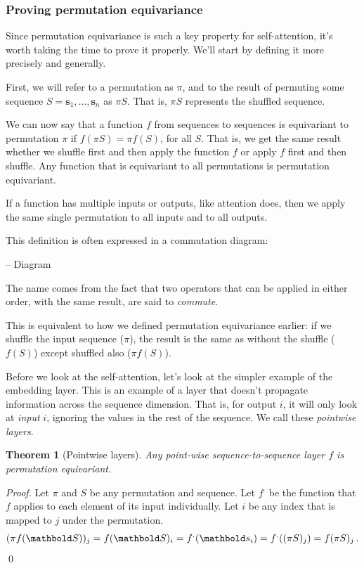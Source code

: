 \documentclass{pca}
\newcommand{\p}{\,\text{.}}
\newenvironment{aside}{
	\setlength{\leftskip}{1em}\par\itshape
}{
	
	\setlength{\leftskip}{0em}\par
}
\newcommand{\mbs}{\mathbold s}
\newcommand{\mbS}{\mathbold S}
\theoremstyle{theorem}
\newtheorem{theorem}{Theorem}
\theoremstyle{definition}
\theoremstyle{proof}
\begin{document}
\subsubsection{Proving permutation equivariance}

Since permutation equivariance is such a key property for self-attention, it's worth taking the time to prove it properly. We'll start by defining it more precisely and generally.

First, we will refer to a permutation as $\pi$, and to the result of permuting some sequence $S = \mbs_1, \ldots, \mbs_n$ as $\pi S$. That is,  $\pi S$ represents the shuffled sequence.

We can now say that a function $f$ from sequences to sequences is equivariant to permutation $\pi$ if $f (\pi S) = \pi f(S)$, for all $S$. That is, we get the same result whether we shuffle first and then apply the function $f$ or apply $f$ first and then shuffle. Any function that is equivariant to all permutations is permutation equivariant.

If a function has multiple inputs or outputs, like attention does, then we apply the same single permutation to all inputs and to all outputs.

This definition is often expressed in a commutation diagram:

-- Diagram

\begin{aside}
The name comes from the fact that two operators that can be applied in either order, with the same result, are said to \emph{commute}.	
\end{aside}

This is equivalent to how we defined permutation equivariance earlier: if we shuffle the input sequence ($\pi$), the result is the same as without the shuffle ($f(S)$) except shuffled also ($\pi f(S)$).

Before we look at the self-attention, let's look at the simpler example of the embedding layer. This is an example of a layer that doesn't propagate information across the sequence dimension. That is, for output $i$, it will only look at \emph{input} $i$, ignoring the values in the rest of the sequence. We call these \emph{pointwise layers}. 

\begin{theorem}[Pointwise layers]\label{thm:pointwise-permeq}
	Any point-wise sequence-to-sequence layer $f$ is permutation equivariant.
\end{theorem}
\begin{proof}
Let $\pi$ and $S$ be any permutation and sequence. Let $f^.$ be the function that $f$ applies to each element of its input individually. Let $i$ be any index that is mapped to $j$ under the permutation.
\[
(\pi f(\mbS))_j = f(\mbS)_i = f^.(\mbs_i) = f^.((\pi S)_j) = f(\pi S)_j \p \hfill
\] \qed
\end{proof}
\end{document}
